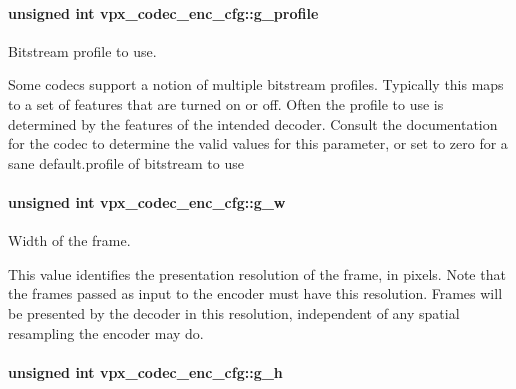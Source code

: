 \paragraph[{\texorpdfstring{g\+\_\+profile}{g_profile}}]{\setlength{\rightskip}{0pt plus 5cm}unsigned int vpx\+\_\+codec\+\_\+enc\+\_\+cfg\+::g\+\_\+profile}\hypertarget{structvpx__codec__enc__cfg_a3d7fe3a8b237338c094d5a956a41804d}{}\label{structvpx__codec__enc__cfg_a3d7fe3a8b237338c094d5a956a41804d}


Bitstream profile to use. 

Some codecs support a notion of multiple bitstream profiles. Typically this maps to a set of features that are turned on or off. Often the profile to use is determined by the features of the intended decoder. Consult the documentation for the codec to determine the valid values for this parameter, or set to zero for a sane default.\+profile of bitstream to use 
\paragraph[{\texorpdfstring{g\+\_\+w}{g_w}}]{\setlength{\rightskip}{0pt plus 5cm}unsigned int vpx\+\_\+codec\+\_\+enc\+\_\+cfg\+::g\+\_\+w}\hypertarget{structvpx__codec__enc__cfg_a5c165f5b41ca1158f2883983a2b7709c}{}\label{structvpx__codec__enc__cfg_a5c165f5b41ca1158f2883983a2b7709c}


Width of the frame. 

This value identifies the presentation resolution of the frame, in pixels. Note that the frames passed as input to the encoder must have this resolution. Frames will be presented by the decoder in this resolution, independent of any spatial resampling the encoder may do. 
\paragraph[{\texorpdfstring{g\+\_\+h}{g_h}}]{\setlength{\rightskip}{0pt plus 5cm}unsigned int vpx\+\_\+codec\+\_\+enc\+\_\+cfg\+::g\+\_\+h}\hypertarget{structvpx__codec__enc__cfg_a4132bd89ce85bce7c08f2cc3b6f2b82e}{}\label{structvpx__codec__enc__cfg_a4132bd89ce85bce7c08f2cc3b6f2b82e}


